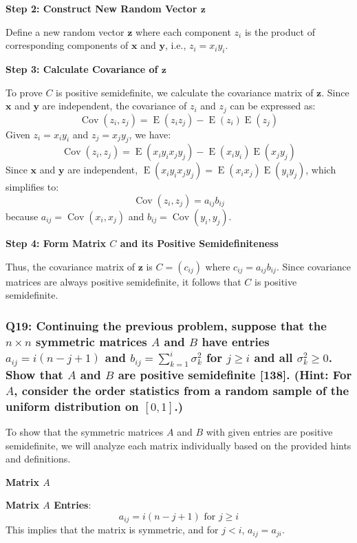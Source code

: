 \documentclass[8pt]{article}
\begin{document}
{{\textbf{Step 2: Construct New Random Vector \(\mathbf{z}\)}

Define a new random vector \(\mathbf{z}\) where each component \(z_i\) is the product of corresponding components of \(\mathbf{x}\) and \(\mathbf{y}\), i.e., \(z_i = x_i y_i\). 

\textbf{Step 3: Calculate Covariance of \(\mathbf{z}\)}

To prove \(C\) is positive semidefinite, we calculate the covariance matrix of \(\mathbf{z}\). Since \(\mathbf{x}\) and \(\mathbf{y}\) are independent, the covariance of \(z_i\) and \(z_j\) can be expressed as:
\[
\operatorname{Cov}(z_i, z_j) = \operatorname{E}(z_i z_j) - \operatorname{E}(z_i) \operatorname{E}(z_j)
\]
Given \(z_i = x_i y_i\) and \(z_j = x_j y_j\), we have:
\[
\operatorname{Cov}(z_i, z_j) = \operatorname{E}(x_i y_i x_j y_j) - \operatorname{E}(x_i y_i) \operatorname{E}(x_j y_j)
\]
Since \(\mathbf{x}\) and \(\mathbf{y}\) are independent, \(\operatorname{E}(x_i y_i x_j y_j) = \operatorname{E}(x_i x_j) \operatorname{E}(y_i y_j)\), which simplifies to:
\[
\operatorname{Cov}(z_i, z_j) = a_{ij} b_{ij}
\]
because \(a_{ij} = \operatorname{Cov}(x_i, x_j)\) and \(b_{ij} = \operatorname{Cov}(y_i, y_j)\).

\textbf{Step 4: Form Matrix \(C\) and its Positive Semidefiniteness}

Thus, the covariance matrix of \(\mathbf{z}\) is \(C = (c_{ij})\) where \(c_{ij} = a_{ij} b_{ij}\). Since covariance matrices are always positive semidefinite, it follows that \(C\) is positive semidefinite.


\subsubsection*{Q19: Continuing the previous problem, suppose that the \(n \times n\) symmetric matrices \(A\) and \(B\) have entries \(a_{ij} = i(n - j + 1)\) and \(b_{ij} = \sum_{k=1}^i \sigma_k^2\) for \(j \geq i\) and all \(\sigma_k^2 \geq 0\). Show that \(A\) and \(B\) are positive semidefinite [138]. (Hint: For \(A\), consider the order statistics from a random sample of the uniform distribution on \([0, 1]\).)}

To show that the symmetric matrices \(A\) and \(B\) with given entries are positive semidefinite, we will analyze each matrix individually based on the provided hints and definitions.

\textbf{Matrix \(A\)}

\textbf{Matrix \(A\) Entries}:
\[ a_{ij} = i(n - j + 1) \text{ for } j \geq i \]
This implies that the matrix is symmetric, and for \(j < i\), \(a_{ij} = a_{ji}\).

}}
\end{document}
